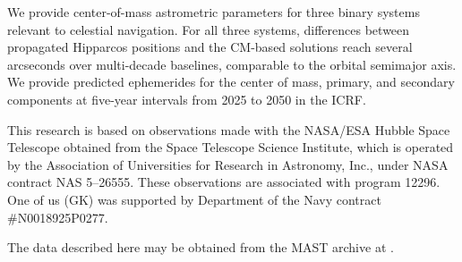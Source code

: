 \documentclass[linenumbers,trackchanges]{aastex701}
\begin{document}
We provide center-of-mass astrometric parameters for three binary systems relevant to celestial navigation. For all
three systems, differences between propagated Hipparcos positions and the CM-based solutions reach several arcseconds
over multi-decade baselines, comparable to the orbital semimajor axis. We provide predicted ephemerides for the center
of mass, primary, and secondary components at five-year intervals from 2025 to 2050 in the ICRF. 

\begin{acknowledgments}

This research is based on observations made with the NASA/ESA Hubble Space Telescope obtained from the Space Telescope Science
Institute, which is operated by the Association of Universities for Research in Astronomy, Inc., under NASA contract NAS
5–26555. These observations are associated with program 12296. One of us (GK) was supported by Department of the Navy
contract \#N0018925P0277. 

The data described here may be obtained from the MAST archive at
.

\end{acknowledgments}


%


\end{document}
